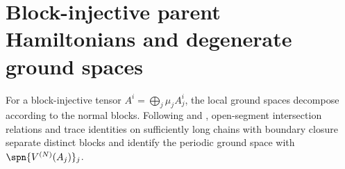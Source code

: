 \chapter{Block-injective parent Hamiltonians and degenerate ground spaces}
\label{ch:parent_hamiltonian_block_ground_spaces}

For a block-injective tensor $A^i=\bigoplus_j \mu_j A_j^i$, the local ground
spaces decompose according to the normal blocks. Following
\cite[Theorem~IV.16]{Cirac2021Matrix} and
\cite[Theorem~12]{PerezGarcia2007Matrix}, open-segment intersection relations
and trace identities on sufficiently long chains with boundary closure separate
distinct blocks and identify the periodic ground space with
$\spn\{V^{(N)}(A_j)\}_j$.











